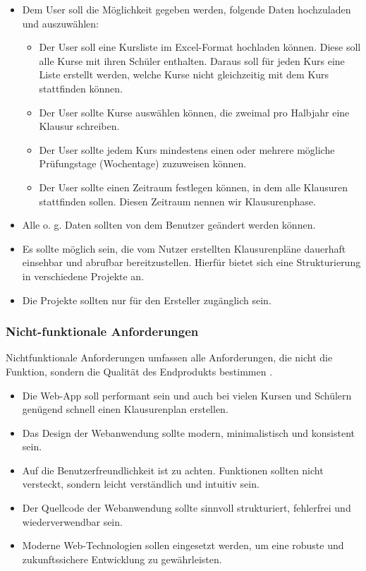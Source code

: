\begin{itemize}
    \item Dem User soll die Möglichkeit gegeben werden, folgende Daten hochzuladen und auszuwählen:
    
    \begin{itemize}
        \item Der User soll eine Kursliste im Excel-Format hochladen können. Diese soll alle Kurse mit ihren Schüler enthalten. Daraus soll für jeden Kurs eine Liste erstellt werden, welche Kurse nicht gleichzeitig mit dem Kurs stattfinden können.
        
        \item Der User sollte Kurse auswählen können, die zweimal pro Halbjahr eine Klausur schreiben.
        
        \item Der User sollte jedem Kurs mindestens einen oder mehrere mögliche Prüfungstage (Wochentage) zuzuweisen können.
        
        \item Der User sollte einen Zeitraum festlegen können, in dem alle Klausuren stattfinden sollen. Diesen Zeitraum nennen wir Klausurenphase.
    \end{itemize}
    
    \item Alle \acrshort{o. g.} Daten sollten von dem Benutzer geändert werden können. 
    
    \item Es sollte möglich sein, die vom Nutzer erstellten Klausurenpläne dauerhaft einsehbar und abrufbar bereitzustellen. Hierfür bietet sich eine Strukturierung in verschiedene Projekte an.
    \item Die Projekte sollten nur für den Ersteller zugänglich sein.
\end{itemize}
\subsubsection{Nicht-funktionale Anforderungen}
Nichtfunktionale Anforderungen umfassen alle Anforderungen, die nicht die Funktion, sondern die Qualität des Endprodukts bestimmen \parencite{anforderungen}.
\begin{itemize}
    \item Die Web-App soll performant sein und auch bei vielen Kursen und Schülern genügend schnell einen Klausurenplan erstellen.
    \item Das Design der Webanwendung sollte modern, minimalistisch und konsistent sein.
    \item Auf die Benutzerfreundlichkeit ist zu achten. Funktionen sollten nicht versteckt, sondern leicht verständlich und intuitiv  sein.
    \item Der Quellcode der Webanwendung sollte sinnvoll strukturiert, fehlerfrei und wiederverwendbar sein.
    \item Moderne Web-Technologien sollen eingesetzt werden, um eine robuste und zukunftssichere Entwicklung zu gewährleisten.
\end{itemize}
\newpage
